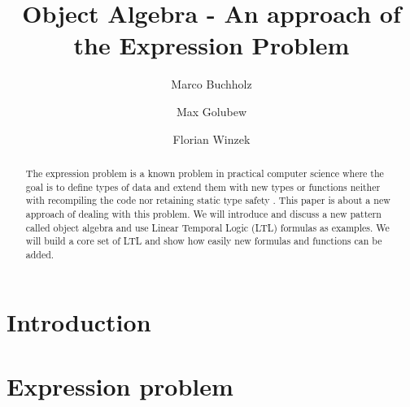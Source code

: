 \documentclass{llncs}
\begin{document}
%
\frontmatter          %
%
\pagestyle{headings}  %
%
\mainmatter              %
%
\title{Object Algebra - An approach of the Expression Problem}
%
%
\author{Marco Buchholz%
\and
Max Golubew%
\and
Florian Winzek%
}
%
%
%

\maketitle              %

\begin{abstract}

The expression problem is a known problem in practical computer science where the goal is to define types of data and extend them with new types or functions neither with recompiling the code nor retaining static type safety \cite{wadler98}. This paper is about a new approach of dealing with this problem. We will introduce and discuss a new pattern called object algebra and use Linear Temporal Logic (LTL) formulas as examples. We will build a core set of LTL and show how easily new formulas and functions can be added. 

\end{abstract}
%
\section{Introduction} \label{sec:introduction}

\section{Expression problem} \label{sec:approaches}
\end{document}
